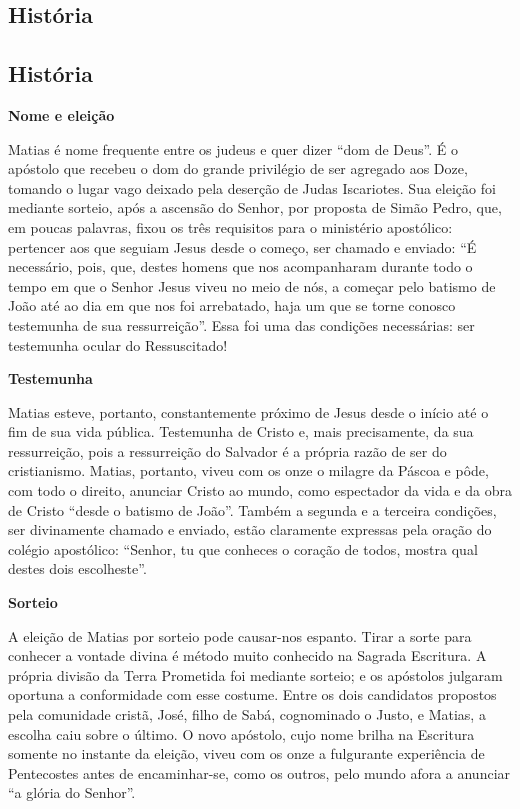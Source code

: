 \documentclass[18pt]{article}
\begin{document}
\begin{justify}
\begin{center}
\section{História}\label{sec:História}
\end{center}


\begin{justify}
\begin{center}
\section{História}\label{sec:História}
\end{center}

\textbf{Nome e eleição}

Matias é nome frequente entre os judeus e quer dizer “dom de Deus”. É o apóstolo que recebeu o dom do grande privilégio de ser agregado aos Doze, tomando o lugar vago deixado pela deserção de Judas Iscariotes. Sua eleição foi mediante sorteio, após a ascensão do Senhor, por proposta de Simão Pedro, que, em poucas palavras, fixou os três requisitos para o ministério apostólico: pertencer aos que seguiam Jesus desde o começo, ser chamado e enviado: “É necessário, pois, que, destes homens que nos acompanharam durante todo o tempo em que o Senhor Jesus viveu no meio de nós, a começar pelo batismo de João até ao dia em que nos foi arrebatado, haja um que se torne conosco testemunha de sua ressurreição”. Essa foi uma das condições necessárias: ser testemunha ocular do Ressuscitado!

\textbf{Testemunha}

Matias esteve, portanto, constantemente próximo de Jesus desde o início até o fim de sua vida pública. Testemunha de Cristo e, mais precisamente, da sua ressurreição, pois a ressurreição do Salvador é a própria razão de ser do cristianismo. Matias, portanto, viveu com os onze o milagre da Páscoa e pôde, com todo o direito, anunciar Cristo ao mundo, como espectador da vida e da obra de Cristo “desde o batismo de João”. Também a segunda e a terceira condições, ser divinamente chamado e enviado, estão claramente expressas pela oração do colégio apostólico: “Senhor, tu que conheces o coração de todos, mostra qual destes dois escolheste”.

\textbf{Sorteio}

A eleição de Matias por sorteio pode causar-nos espanto. Tirar a sorte para conhecer a vontade divina é método muito conhecido na Sagrada Escritura. A própria divisão da Terra Prometida foi mediante sorteio; e os apóstolos julgaram oportuna a conformidade com esse costume. Entre os dois candidatos propostos pela comunidade cristã, José, filho de Sabá, cognominado o Justo, e Matias, a escolha caiu sobre o último. O novo apóstolo, cujo nome brilha na Escritura somente no instante da eleição, viveu com os onze a fulgurante experiência de Pentecostes antes de encaminhar-se, como os outros, pelo mundo afora a anunciar “a glória do Senhor”.


\end{justify}
\end{justify}
\end{document}
